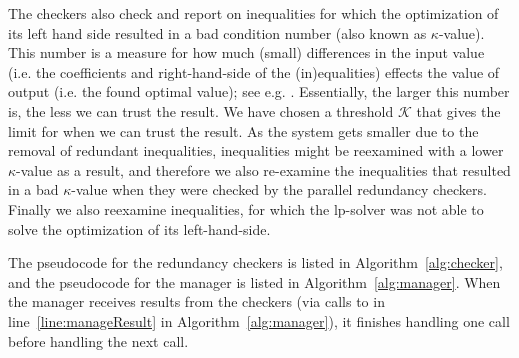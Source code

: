 The checkers also check and report on inequalities for which the optimization of its left hand side resulted in a bad condition number (also known as $\kappa$-value). This number is a measure for how much (small) differences in the input value (i.e. the coefficients and right-hand-side of the (in)equalities) effects the value of output (i.e. the found optimal value); see {e.g. \cite{numAnalysis}}. Essentially, the larger this number is, the less we can trust the result. We have chosen a threshold $\mathcal{K}$ that gives the limit for when we can trust the result. As the system gets smaller due to the removal of redundant inequalities, inequalities might be reexamined with a lower $\kappa$-value as a result, and therefore we also re-examine the inequalities that resulted in a bad $\kappa$-value when they were checked by the parallel redundancy checkers. 
Finally we also reexamine inequalities, for which the lp-solver was not able to solve the optimization of its left-hand-side.

The pseudocode for the redundancy checkers is listed in Algorithm~\ref{alg:checker}, and the pseudocode for the manager is listed in Algorithm~\ref{alg:manager}. 
When the manager receives results from the checkers (via calls to  in line~\ref{line:manageResult} in Algorithm~\ref{alg:manager}), it finishes handling one call before handling the next call. %


